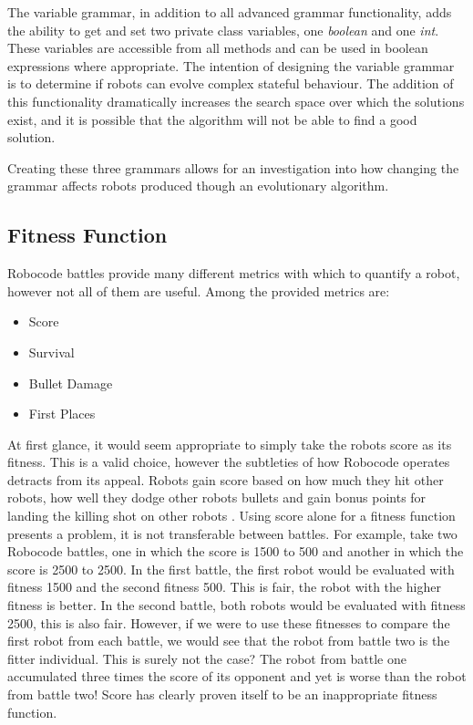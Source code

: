 \documentclass[a4paper, 12pt]{article}
\begin{document}
The variable grammar, in addition to all advanced grammar functionality, adds the ability to get and set two private class variables, one \textit{boolean} and one \textit{int}. These variables are accessible from all methods and can be used in boolean expressions where appropriate. The intention of designing the variable grammar is to determine if robots can evolve complex stateful behaviour. The addition of this functionality dramatically increases the search space over which the solutions exist, and it is possible that the algorithm will not be able to find a good solution.

Creating these three grammars allows for an investigation into how changing the grammar affects robots produced though an evolutionary algorithm.

\subsection{Fitness Function}

Robocode battles provide many different metrics with which to quantify a robot, however not all of them are useful. Among the provided metrics are\cite{robocode_scoring}: 
\begin{itemize}
\item Score
\item Survival
\item Bullet Damage
\item First Places
\end{itemize}
At first glance, it would seem appropriate to simply take the robots score as its fitness. This is a valid choice, however the subtleties of how Robocode operates detracts from its appeal. Robots gain score based on how much they hit other robots, how well they dodge other robots bullets and gain bonus points for landing the killing shot on other robots \cite{robocode_scoring}. Using score alone for a fitness function presents a problem, it is not transferable between battles. For example, take two Robocode battles, one in which the score is 1500 to 500 and another in which the score is 2500 to 2500. In the first battle, the first robot would be evaluated with fitness 1500 and the second fitness 500. This is fair, the robot with the higher fitness is better. In the second battle, both robots would be evaluated with fitness 2500, this is also fair. However, if we were to use these fitnesses to compare the first robot from each battle, we would see that the robot from battle two is the fitter individual. This is surely not the case? The robot from battle one accumulated three times the score of its opponent and yet is worse than the robot from battle two! Score has clearly proven itself to be an inappropriate fitness function.
\end{document}
